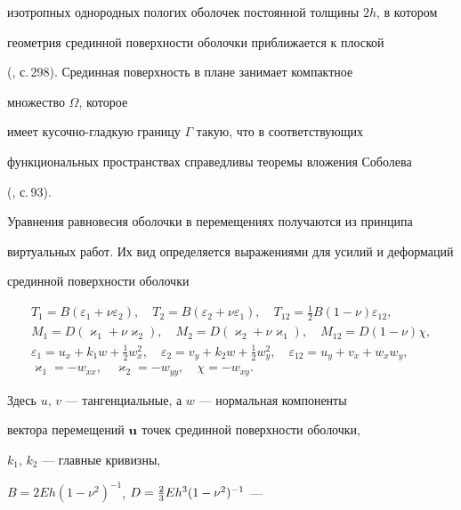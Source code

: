 изотропных однородных пологих оболочек постоянной толщины $2h$, в котором


геометрия срединной поверхности оболочки приближается к плоской


(\cite{vlasov}, с.\,298). Срединная поверхность в плане занимает компактное


множество $\Omega$, которое


имеет кусочно-гладкую границу $\Gamma$ такую, что в соответствующих


функциональных пространствах справедливы теоремы вложения Соболева


(\cite{lebedev1996}, с.\,93).





Уравнения равновесия оболочки в перемещениях получаются из принципа


виртуальных работ. Их вид определяется выражениями для усилий и деформаций


срединной поверхности оболочки


\begin{gather*}


T_1=B(\varepsilon_1+\nu\varepsilon_2),\quad


T_2=B(\varepsilon_2+\nu\varepsilon_1),\quad


T_{12}=\frac{1}{2}B(1-\nu)\varepsilon_{12},\\


M_1=D(\varkappa_1+\nu \varkappa_2),\quad M_2=D(\varkappa_2+\nu \varkappa_1),


\quad M_{12}=D(1-\nu)\chi,\\


\varepsilon_1=u_x+k_1w+\frac{1}{2}w_x^2, \quad


\varepsilon_2=v_y+k_2w+\frac{1}{2}w_y^2,  \quad


\varepsilon_{12}=u_y+v_x+w_xw_y,\\


\varkappa_1=-w_{xx},\quad \varkappa_2=-w_{yy},\quad \chi=-w_{xy}.


\end{gather*}


Здесь $u$, $v$ --- тангенциальные, а $w$ --- нормальная компоненты


вектора перемещений ${\bold u}$ точек срединной поверхности оболочки,


$k_1$, $k_2$ --- главные кривизны,


$B=2Eh(1-\nu^2)^{-1}$,  $D=\linebreak\frac{2}{3}Eh^3(1-\nu^2)^{-1}$ ---


